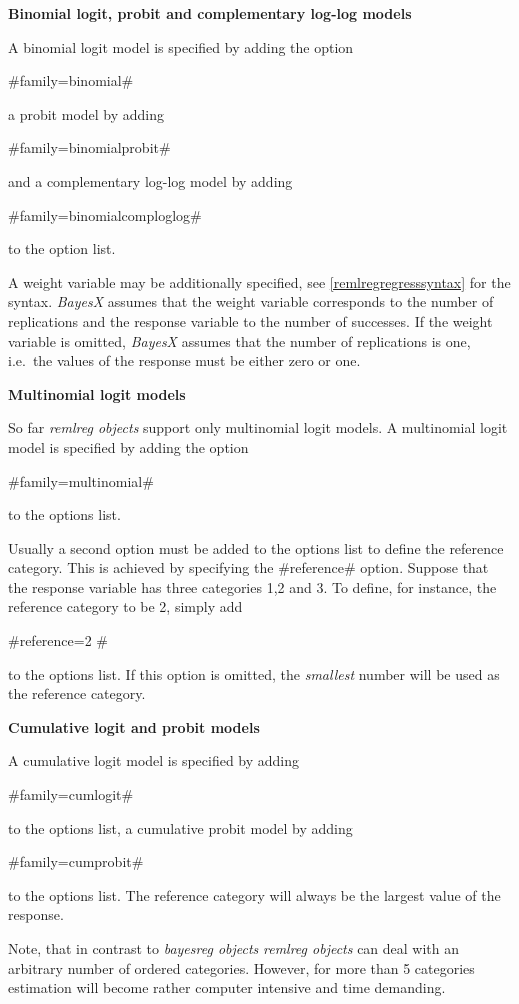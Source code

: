 {\bf Binomial logit, probit and complementary log-log models}

A binomial logit model is specified by adding the option

#family=binomial#

a probit model by adding

#family=binomialprobit#

and a complementary log-log model by adding

#family=binomialcomploglog#

to the option list.

A weight variable may be additionally specified, see
\autoref{remlregregresssyntax} for the syntax. {\em BayesX}
assumes that the weight variable corresponds to the number of
replications and the response variable to the number of successes.
If the weight variable is omitted, {\em BayesX} assumes that the
number of replications is one, i.e.~the values of the response
must be either zero or one.

{\bf Multinomial logit models}

So far {\em remlreg objects} support only multinomial logit
models. A multinomial logit model is specified by adding the
option

#family=multinomial#

to the options list.

Usually a second option must be added to the options list to
define the reference category. This is achieved by specifying the
#reference# option. Suppose that the response variable has three
categories 1,2 and 3. To define, for instance, the reference
category to be 2, simply add

#reference=2 #

to the options list. If this option is omitted, the {\em smallest}
number will be used as the reference category.

{\bf Cumulative logit and probit models}

A cumulative logit model is specified by adding

#family=cumlogit#

to the options list, a cumulative probit model by adding

#family=cumprobit#

to the options list. The reference category will always be the
largest value of the response.

Note, that in contrast to {\em bayesreg objects} {\em remlreg
objects} can deal with an arbitrary number of ordered categories.
However, for more than 5 categories estimation will become rather
computer intensive and time demanding.

